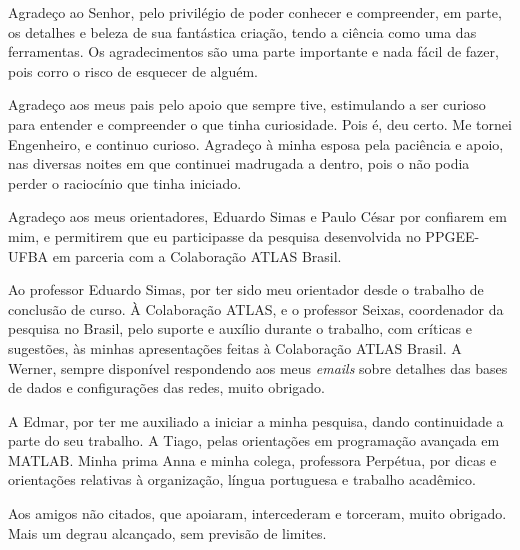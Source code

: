 \begin{agradecimentos}

Agradeço ao Senhor, pelo privilégio de poder conhecer e compreender, em parte, os detalhes e beleza de sua fantástica criação, tendo a ciência como uma das ferramentas. Os agradecimentos são uma parte importante e nada fácil de fazer, pois corro o risco de esquecer de alguém. 

Agradeço aos meus pais pelo apoio que sempre tive, estimulando a ser curioso para entender e compreender o que tinha curiosidade. Pois é, deu certo. Me tornei Engenheiro, e continuo curioso. Agradeço à minha esposa pela paciência e apoio, nas diversas noites em que continuei madrugada a dentro, pois o não podia perder o raciocínio que tinha iniciado. 

Agradeço aos meus orientadores, Eduardo Simas e Paulo César por confiarem em mim, e permitirem que eu participasse da pesquisa desenvolvida no PPGEE-UFBA em parceria com a Colaboração ATLAS Brasil.

Ao professor Eduardo Simas, por ter sido meu orientador desde o trabalho de conclusão de curso. À Colaboração ATLAS, e o professor Seixas, coordenador da pesquisa no Brasil, pelo suporte e auxílio durante o trabalho, com críticas e sugestões, às minhas apresentações feitas à Colaboração ATLAS Brasil. A Werner, sempre disponível respondendo aos meus \textit{emails} sobre detalhes das bases de dados e configurações das redes, muito obrigado.

A Edmar, por ter me auxiliado a iniciar a minha pesquisa, dando continuidade a parte do seu trabalho. A Tiago, pelas orientações em programação avançada em MATLAB. Minha prima Anna e minha colega, professora Perpétua, por dicas e orientações relativas à organização, língua portuguesa e trabalho acadêmico. 

Aos amigos não citados, que apoiaram, intercederam e torceram, muito obrigado. Mais um degrau alcançado, sem previsão de limites.


\end{agradecimentos}